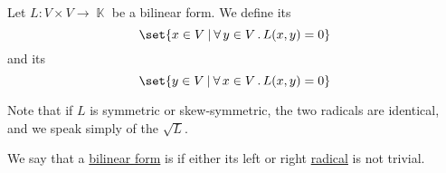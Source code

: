\begin{definition}\label{def:bilinear_form_radicals}
  Let \( L: V \times V \to \BbbK \) be a bilinear form. We define its 
  \begin{equation*}
    \set{ x \in V \given \qforall {y \in V} L(x, y) = 0 }
  \end{equation*}
  and its 
  \begin{equation*}
    \set{ y \in V \given \qforall {x \in V} L(x, y) = 0 }
  \end{equation*}

  Note that if \( L \) is symmetric or skew-symmetric, the two radicals are identical, and we speak simply of the  \( \sqrt L \).
\end{definition}

\begin{definition}\label{def:degenerate_bilinear_form}
  We say that a \hyperref[def:bilinear_form]{bilinear form} is  if either its left or right \hyperref[def:bilinear_form_radicals]{radical} is not trivial.
\end{definition}

